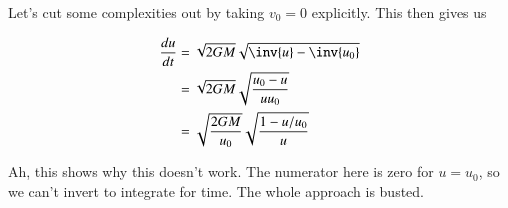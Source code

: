 Let's cut some complexities out by taking $v_0 = 0$ explicitly.  This then gives us

\begin{align*}
\frac{du}{dt}
&= \sqrt{2GM} \sqrt{\inv{u} - \inv{u_0}} \\
&= \sqrt{2GM} \sqrt{\frac{u_0 - u}{u u_0}} \\
&= \sqrt{\frac{2GM}{u_0}} \sqrt{\frac{1 - u/u_0}{u}} \\
\end{align*}

Ah, this shows why this doesn't work.  The numerator here is zero for $u = u_0$, so we can't invert to integrate for time.  The whole approach is busted.

%
%

%
